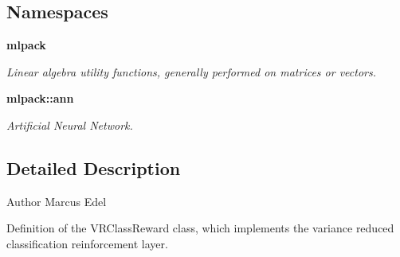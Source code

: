\subsection*{Namespaces}
\begin{DoxyCompactItemize}
\item 
 {\bf mlpack}
\begin{DoxyCompactList}\small\item\em Linear algebra utility functions, generally performed on matrices or vectors. \end{DoxyCompactList}\item 
 {\bf mlpack\+::ann}
\begin{DoxyCompactList}\small\item\em Artificial Neural Network. \end{DoxyCompactList}\end{DoxyCompactItemize}


\subsection{Detailed Description}
\begin{DoxyAuthor}{Author}
Marcus Edel
\end{DoxyAuthor}
Definition of the V\+R\+Class\+Reward class, which implements the variance reduced classification reinforcement layer. 